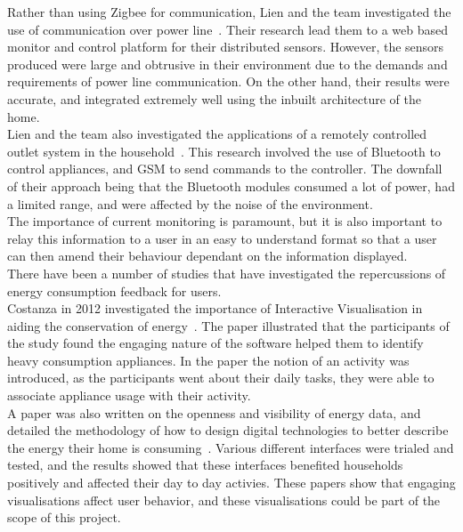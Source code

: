 \documentclass[preprint,12pt,3p]{elsarticle}
\begin{document}
Rather than using Zigbee for communication, Lien and the team investigated the use of communication over power line~\cite{lien2008power}. Their research lead them to a web based monitor and control platform for their distributed sensors. However, the sensors produced were large and obtrusive in their environment due to the demands and requirements of power line communication. On the other hand, their results were accurate, and integrated extremely well using the inbuilt architecture of the home. \\
Lien and the team also investigated the applications of a remotely controlled outlet system in the household~\cite{lien2006remotely}. This research involved the use of Bluetooth to control appliances, and GSM to send commands to the controller. The downfall of their approach being that the Bluetooth modules consumed a lot of power, had a limited range, and were affected by the noise of the environment.\\
The importance of current monitoring is paramount, but it is also important to relay this information to a user in an easy to understand format so that a user can then amend their behaviour dependant on the information displayed.\\
There have been a number of studies that have investigated the repercussions of energy consumption feedback for users.\\
Costanza in 2012 investigated the importance of Interactive Visualisation in aiding the conservation of energy~\cite{costanza2012understanding}. The paper illustrated that the participants of the study found the engaging nature of the software helped them to identify heavy consumption appliances. In the paper the notion of an activity was introduced, as the participants went about their daily tasks, they were able to associate appliance usage with their activity. \\
A paper was also written on the openness and visibility of energy data, and detailed the methodology of how to design digital technologies to better describe the energy their home is consuming~\cite{price2013looking}. Various different interfaces were trialed and tested, and the results showed that these interfaces benefited households positively and affected their day to day activies.
These papers show that engaging visualisations affect user behavior, and these visualisations could be part of the scope of this project.\\
\end{document}
